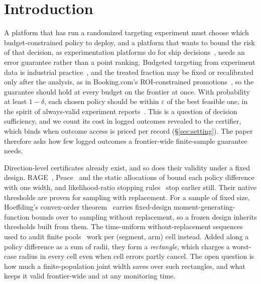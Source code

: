 \documentclass[sigconf,anonymous,review]{acmart}
\newcommand{\eps}{\varepsilon}
\begin{document}

\maketitle

\section{Introduction}\label{sec:intro}

A platform that has run a randomized targeting experiment must choose which budget-constrained policy to deploy, and a platform that wants to bound the risk of that decision, as experimentation platforms do for ship decisions~\citep{schultzberg2024riskaware}, needs an error guarantee rather than a point ranking. Budgeted targeting from experiment data is industrial practice~\citep{zhao2019uplift,ai2022lbcf}, and the treated fraction may be fixed or recalibrated only after the analysis, as in Booking.com's ROI-constrained promotions~\citep{goldenberg2020freelunch}, so the guarantee should hold at every budget on the frontier at once. With probability at least $1-\delta$, each chosen policy should be within $\eps$ of the best feasible one, in the spirit of always-valid experiment reports~\citep{johari2017peeking,howard2021time}. This is a question of decision sufficiency, and we count its cost in logged outcomes revealed to the certifier, which binds when outcome access is priced per record (\S\ref{sec:setting}). The paper therefore asks how few logged outcomes a frontier-wide finite-sample guarantee needs.

Direction-level certificates already exist, and so does their validity under a fixed design. RAGE~\citep{fiez2019sequential}, Peace~\citep{katzsamuels2020empirical} and the static allocations of \citet{soare2014best} bound each policy difference with one width, and likelihood-ratio stopping rules~\citep{garivier2016optimal,jourdan2021efficient} stop earlier still. Their native thresholds are proven for sampling with replacement. For a sample of fixed size, Hoeffding's convex-order theorem~\citep{hoeffding1963probability} carries fixed-design moment-generating-function bounds over to sampling without replacement, so a frozen design inherits thresholds built from them. The time-uniform without-replacement sequences used to audit finite pools~\citep{waudbysmith2020confidence,waudbysmith2024estimating} work per (segment, arm) cell instead. Added along a policy difference as a sum of radii, they form a \emph{rectangle}, which charges a worst-case radius in every cell even when cell errors partly cancel. The open question is how much a finite-population joint width saves over such rectangles, and what keeps it valid frontier-wide and at any monitoring time.
\end{document}
